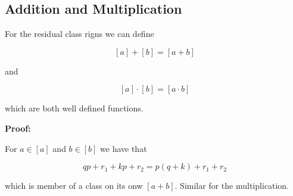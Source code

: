 \subsection{Addition and Multiplication}

For the residual class rigns we can define

\[
	[a] + [b] = [a + b]
\]

and

\[
	[a] \cdot [b] = [a \cdot b]
\]

which are both well defined functions.

\textbf{Proof:}

For \(a \in [a]\) and \(b \in [b]\) we have that

\[
	qp + r_1 + kp + r_2 = p(q + k) + r_1 + r_2
\]

which is member of a class on its onw \([a + b]\). Similar for the multiplication.

\QED


